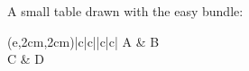 \documentclass{article}
\begin{document}
A small table drawn with the easy bundle:
\begin{TAB}(e,2cm,2cm){|c|c|}{|c|c|}
A & B \\
C & D \\
\end{TAB}
\end{document}
